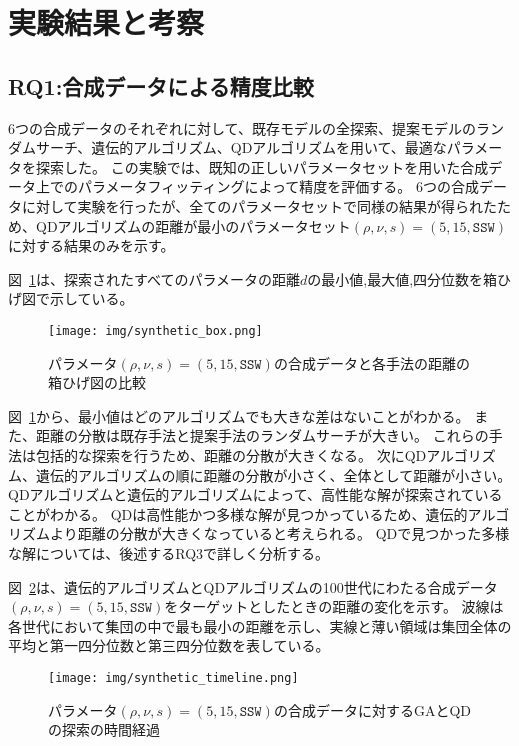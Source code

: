 \documentclass[uplatex,11pt,openany]{ujreport}
\begin{document}
    \section{実験結果と考察}
        \subsection{RQ1:合成データによる精度比較}
            6つの合成データのそれぞれに対して、既存モデルの全探索、提案モデルのランダムサーチ、遺伝的アルゴリズム、QDアルゴリズムを用いて、最適なパラメータを探索した。
            この実験では、既知の正しいパラメータセットを用いた合成データ上でのパラメータフィッティングによって精度を評価する。
            6つの合成データに対して実験を行ったが、全てのパラメータセットで同様の結果が得られたため、QDアルゴリズムの距離が最小のパラメータセット$(\rho, \nu, s) = (5, 15, \texttt{SSW})$に対する結果のみを示す。

            図~\ref{fig:synthetic_boxplot}は、探索されたすべてのパラメータの距離$d$の最小値,最大値,四分位数を箱ひげ図で示している。
            \begin{figure}[H]
                \centering
                \texttt{[image: img/synthetic\_box.png]}
                \caption{パラメータ$(\rho,\nu,s)=(5,15,\texttt{SSW})$の合成データと各手法の距離の箱ひげ図の比較}
                \label{fig:synthetic_boxplot}
            \end{figure}


            図~\ref{fig:synthetic_boxplot}から、最小値はどのアルゴリズムでも大きな差はないことがわかる。
            また、距離の分散は既存手法と提案手法のランダムサーチが大きい。
            これらの手法は包括的な探索を行うため、距離の分散が大きくなる。
            次にQDアルゴリズム、遺伝的アルゴリズムの順に距離の分散が小さく、全体として距離が小さい。
            QDアルゴリズムと遺伝的アルゴリズムによって、高性能な解が探索されていることがわかる。
            QDは高性能かつ多様な解が見つかっているため、遺伝的アルゴリズムより距離の分散が大きくなっていると考えられる。
            QDで見つかった多様な解については、後述するRQ3で詳しく分析する。


            図~\ref{fig:synthetic_timeline}は、遺伝的アルゴリズムとQDアルゴリズムの100世代にわたる合成データ$(\rho, \nu, s) = (5, 15, \texttt{SSW})$をターゲットとしたときの距離の変化を示す。
            波線は各世代において集団の中で最も最小の距離を示し、実線と薄い領域は集団全体の平均と第一四分位数と第三四分位数を表している。

            \begin{figure}[H]
                \centering
                \texttt{[image: img/synthetic\_timeline.png]}
                \caption{パラメータ$(\rho,\nu,s)=(5,15,\texttt{SSW})$の合成データに対するGAとQDの探索の時間経過}
                \label{fig:synthetic_timeline}
            \end{figure}
\end{document}
